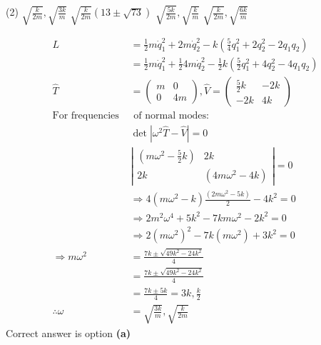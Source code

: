 \begin{enumerate}
\begin{tasks}(2)
	\task[\textbf{a.}]$\sqrt{\frac{k}{2 m}}, \sqrt{\frac{3 k}{m}}$
	\task[\textbf{b.}]$\sqrt{\frac{k}{2 m}}(13 \pm \sqrt{73})$
	\task[\textbf{c.}]$\sqrt{\frac{5 k}{2 m}}, \sqrt{\frac{k}{m}}$
	\task[\textbf{d.}]  $\sqrt{\frac{k}{2 m}}, \sqrt{\frac{6 k}{m}}$
\end{tasks}
\begin{answer}
	\begin{align*}
	L &=\frac{1}{2} m \dot{q}_{1}^{2}+2 m \dot{q}_{2}^{2}-k\left(\frac{5}{4} q_{1}^{2}+2 q_{2}^{2}-2 q_{1} q_{2}\right) \\ &=\frac{1}{2} m \dot{q}_{1}^{2}+\frac{1}{2} 4 m \dot{q}_{2}^{2}-\frac{1}{2} k\left(\frac{5}{2} q_{1}^{2}+4 q_{2}^{2}-4 q_{1} q_{2}\right) \\ \hat{T} &=\left(\begin{array}{cc}m & 0 \\ 0 & 4 m\end{array}\right), \hat{V}=\left(\begin{array}{cc}\frac{5}{2} k & -2 k \\ -2 k & 4 k\end{array}\right) \\
	\text{For frequencies }&\text{ of normal modes:}\\
	&\operatorname{det}\left|\omega^{2} \hat{T}-\hat{V}\right|=0\\
	&\left|\begin{array}{cc}\left(m \omega^{2}-\frac{5}{2} k\right) & 2 k \\
	 2 k & \left(4 m \omega^{2}-4 k\right)\end{array}\right|=0 \\
	&\Rightarrow 4\left(m \omega^{2}-k\right) \frac{\left(2 m \omega^{2}-5 k\right)}{2}-4 k^{2}=0\\
	&\Rightarrow 2 m^{2} \omega^{4}+5 k^{2}-7 k m \omega^{2}-2 k^{2}=0\\
	&\Rightarrow 2\left(m \omega^{2}\right)^{2}-7 k\left(m \omega^{2}\right)+3 k^{2}=0\\
	\Rightarrow m \omega^{2}&=\frac{7 k \pm \sqrt{49 k^{2}-24 k^{2}}}{4}\\&
	=\frac{7 k \pm \sqrt{49 k^{2}-24 k^{2}}}{4}\\&=\frac{7 k \pm 5 k}{4}=3 k, \frac{k}{2}\\
	\therefore \omega&=\sqrt{\frac{3 k}{m}}, \sqrt{\frac{k}{2 m}}
	\end{align*}
	Correct answer is option \textbf{(a)}
\end{answer}

\end{enumerate}
